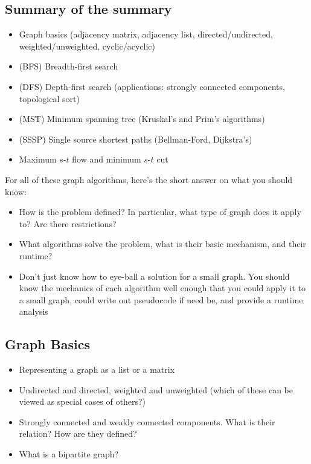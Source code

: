 \documentclass[11  pt]{exam}
\begin{document}
	\subsection{Summary of the summary}
	\begin{itemize}
		\item Graph basics (adjacency matrix, adjacency list, directed/undirected, weighted/unweighted, cyclic/acyclic)
		\item (BFS) Breadth-first search
		\item (DFS) Depth-first search (applications: strongly connected components, topological sort)
		\item (MST) Minimum spanning tree (Kruskal's and Prim's algorithms)
		\item (SSSP) Single source shortest paths (Bellman-Ford, Dijkstra's)
		\item Maximum $s$-$t$ flow and minimum $s$-$t$ cut
	\end{itemize}

For all of these graph algorithms, here's the short answer on what you should know:

\begin{itemize}
	\item How is the problem defined? In particular, what type of graph does it apply to? Are there restrictions?
	\item What algorithms solve the problem, what is their basic mechanism, and their runtime?
	\item Don't just know how to eye-ball a solution for a small graph. You should know the mechanics of each algorithm well enough that you could apply it to a small graph, could write out pseudocode if need be, and provide a runtime analysis 
\end{itemize}
	
\subsection{Graph Basics}
	
	\begin{itemize}
		\item Representing a graph as a list or a matrix
		\item Undirected and directed, weighted and unweighted (which of these can be viewed as special cases of others?)
		\item Strongly connected and weakly connected components. What is their relation? How are they defined?
		\item What is a bipartite graph?
	\end{itemize}
\end{document}
